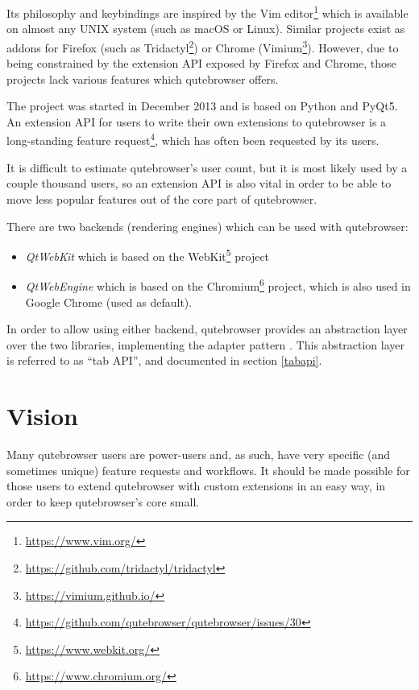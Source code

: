 \documentclass[a4paper,parskip=full]{scrreprt}
\begin{document}
Its philosophy and keybindings are inspired by the Vim
editor\footnote{\url{https://www.vim.org/}} which is available on almost any
UNIX system (such as macOS or Linux). Similar projects exist as addons for
Firefox (such as Tridactyl\footnote{\url{https://github.com/tridactyl/tridactyl}})
or Chrome (Vimium\footnote{\url{https://vimium.github.io/}}). However, due to
being constrained by the extension API exposed by Firefox and Chrome, those
projects lack various features which qutebrowser offers.

The project was started in December 2013 and is based on Python and PyQt5. An
extension API for users to write their own extensions to qutebrowser is a
long-standing feature
request\footnote{\url{https://github.com/qutebrowser/qutebrowser/issues/30}},
which has often been requested by its users.

It is difficult to estimate qutebrowser's user count, but it is most likely used by a
couple thousand users, so an extension API is also vital in order to be able to move
less popular features out of the core part of qutebrowser.

\label{backends}
There are two backends (rendering engines) which can be used with qutebrowser:

\begin{itemize}
  \item \emph{QtWebKit} which is based on the
  WebKit\footnote{\url{https://www.webkit.org/}} project
  \item \emph{QtWebEngine} which is based on the
  Chromium\footnote{\url{https://www.chromium.org/}} project, which is also used
  in Google Chrome (used as default).
\end{itemize}

In order to allow using either backend, qutebrowser provides an abstraction
layer over the two libraries, implementing the adapter pattern
\autocite[139ff]{gof}. This abstraction layer is referred to as ``tab API'', and
documented in section \ref{tabapi}.

\section{Vision}
\label{vision}

Many qutebrowser users are power-users and, as such, have very specific (and
sometimes unique) feature requests and workflows. It should be made possible for
those users to extend qutebrowser with custom extensions in an easy way, in order
to keep qutebrowser's core small.
\end{document}
